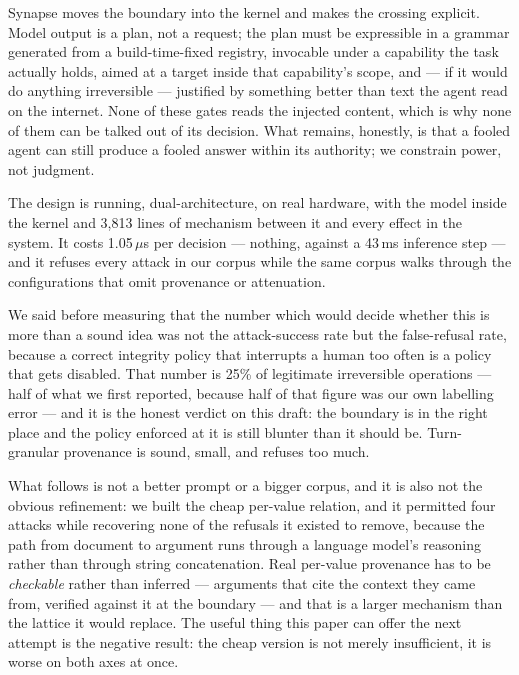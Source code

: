\documentclass[11pt]{article}
\newcommand{\syn}{Synapse}
\begin{document}
\syn{} moves the boundary into the kernel and makes the crossing explicit.
Model output is a plan, not a request; the plan must be expressible in a
grammar generated from a build-time-fixed registry, invocable under a
capability the task actually holds, aimed at a target inside that
capability's scope, and --- if it would do anything irreversible --- justified by
something better than text the agent read on the internet. None of these gates
reads the injected content, which is why none of them can be talked out of its
decision. What remains, honestly, is that a fooled agent can still produce a
fooled answer within its authority; we constrain power, not judgment.

The design is running, dual-architecture, on real hardware, with the model
inside the kernel and 3{,}813 lines of mechanism between it and every effect in
the system. It costs 1.05\,$\mu$s per decision --- nothing, against a 43\,ms
inference step --- and it refuses every attack in our corpus while the same
corpus walks through the configurations that omit provenance or attenuation.

We said before measuring that the number which would decide whether this is more
than a sound idea was not the attack-success rate but the false-refusal rate,
because a correct integrity policy that interrupts a human too often is a policy
that gets disabled. That number is 25\% of legitimate irreversible operations
--- half of what we first reported, because half of that figure was our own
labelling error --- and it is the honest verdict on this draft: the boundary is
in the right place and the policy enforced at it is still blunter than it should
be. Turn-granular provenance is sound, small, and refuses too much.

What follows is not a better prompt or a bigger corpus, and it is also not the
obvious refinement: we built the cheap per-value relation, and it permitted four
attacks while recovering none of the refusals it existed to remove, because the
path from document to argument runs through a language model's reasoning rather
than through string concatenation. Real per-value provenance has to be
\emph{checkable} rather than inferred --- arguments that cite the context they
came from, verified against it at the boundary --- and that is a larger
mechanism than the lattice it would replace. The useful thing this paper can
offer the next attempt is the negative result: the cheap version is not merely
insufficient, it is worse on both axes at once.



\end{document}
